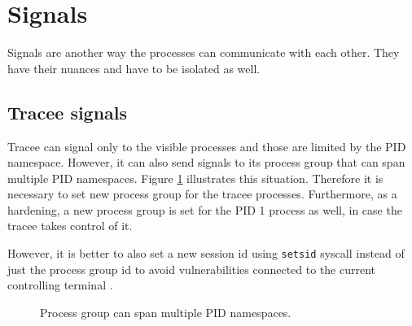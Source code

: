 \documentclass[en]{pracamgr}
\begin{document}
\section{Signals}

Signals are another way the processes can communicate with each other. They have their nuances and have to be isolated as well.

\subsection{Tracee signals}

Tracee can signal only to the visible processes and those are limited by the PID namespace. However, it can also send signals to its process group that can span multiple PID namespaces. Figure \ref{fig:pgid_and_pid_namespace} illustrates this situation. Therefore it is necessary to set new process group for the tracee processes. Furthermore, as a hardening, a new process group is set for the PID 1 process as well, in case the tracee takes control of it.

However, it is better to also set a new session id using \texttt{setsid} syscall instead of just the process group id to avoid vulnerabilities connected to the current controlling terminal \cite{bubblewrap_cve}.

\begin{figure}[h]
\tikzset{>=latex} %
\centering
{}
\caption{Process group can span multiple PID namespaces.}
\label{fig:pgid_and_pid_namespace}
\end{figure}
\end{document}
